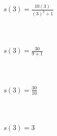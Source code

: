 \begin{eqnarray}s(3)=\frac{10(3)}{(3)^2+1}\\\\\\\\\\\\\\\\\\\\
s(3)=\frac{30}{9+1}\\\\\\\\\\\\\\\\\\\\
s(3)=\frac{30}{10}\\\\\\\\\\\\\\\\\\\\
s(3)=3\end{eqnarray}